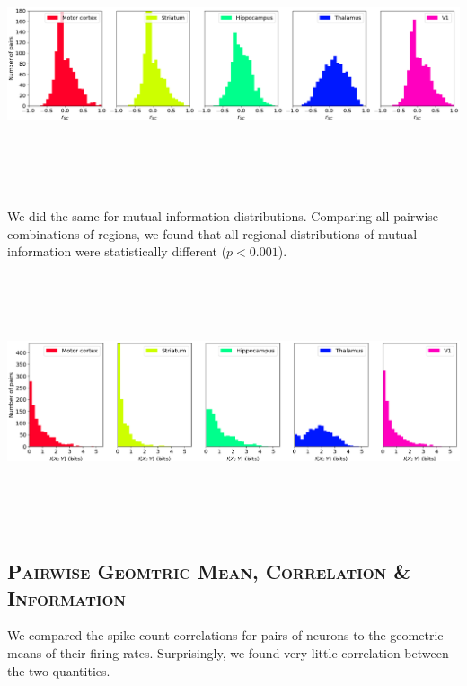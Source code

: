 \documentclass[a0,portrait]{a0poster}
\begin{document}
\begin{multicols}{2}
\includegraphics[width=\linewidth, height=7.5cm]{correlation_histograms.png}

We did the same for mutual information distributions. Comparing all pairwise combinations of regions, we found that all regional distributions of mutual information were statistically different ($p < 0.001$).

\includegraphics[width=\linewidth, height=7.5cm]{information_histograms.png}

\subsection*{\color{NavyBlue}\textsc{Pairwise Geomtric Mean, Correlation \& Information}\color{Black}}

We compared the spike count correlations for pairs of neurons to the geometric means of their firing rates. Surprisingly, we found very little correlation between the two quantities.


\end{multicols}
\end{document}
